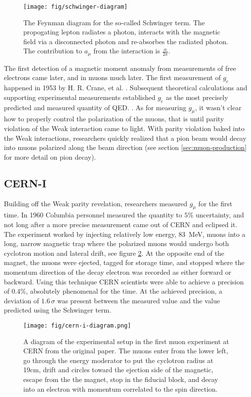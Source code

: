 \begin{figure}
\label{fig:schwinger-diagram}
\centering
\texttt{[image: fig/schwinger-diagram]}
\caption{The Feynman diagram for the so-called Schwinger term. The propogating lepton radiates a photon, interacts with the magnetic field via a disconnected photon and re-absorbes the radiated photon.  The contribution to $a_\mu$ from the interaction is $\frac{\alpha}{2\pi}$.}
\end{figure}

The first detection of a magnetic moment anomaly from measurements of free electrons came later, and in muons much later.  The first measurement of $g_e$ happened in 1953 by H. R. Crane, et al. .  Subsequent theoretical calculations and supporting experimental measurements established $g_e$ as the most precisely predicted and measured quantity of QED.  .  As for measuring $g_\mu$, it wasn't clear how to properly control the polarization of the muons, that is until parity violation of the Weak interaction came to light.  With parity violation baked into the Weak interactions, researchers quickly realized that a pion beam would decay into muons polarized along the beam direction (see section \ref{sec:muon-production} for more detail on pion decay).

\subsection{CERN-I}
Building off the Weak parity revelation, researchers measured $g_\mu$ for the first time.  In 1960 Columbia personnel measured the quantity to $5\%$ uncertainty, and not long after a more precise measurement came out of CERN and eclipsed it.  The experiment worked by injecting relatively low energy, \SI{83}{\MeV}, muons into a long, narrow magnetic trap where the polarized muons would undergo both cyclotron motion and lateral drift, see figure \ref{fig:cern-i-diagram}. At the opposite end of the magnet, the muons were ejected, tagged for storage time, and stopped where the momentum direction of the decay electron was recorded as either forward or backward.  Using this technique CERN scientists were able to achieve a precision of $0.4\%$, absolutely phenomenal for the time\cite{cern-i}.  At the achieved precision, a deviation of $1.6\,\sigma$ was present between the measured value and the value predicted using the Schwinger term\cite{47y-muon-g-2}.

\begin{figure}
\centering
\texttt{[image: fig/cern-i-diagram.png]}
\label{fig:cern-i-diagram}
\caption{A diagram of the experimental setup in the first muon \gmtwo experiment at CERN from the original paper\cite{cern-i}. The muons enter from the lower left, go through the energy moderator to put the cyclotron radius at 19cm, drift and circles toward the ejection side of the magnetic, escape from the the magnet, stop in the fiducial block, and decay into an electron with momentum correlated to the spin direction.}
\end{figure}

